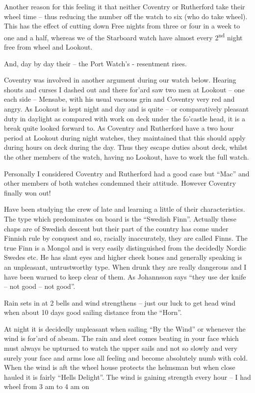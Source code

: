 \documentclass[
  11pt,
  msmallroyalvopaper
]{memoir}
\begin{document}
Another reason for this feeling it that neither Coventry or Rutherford
take their wheel time -- thus reducing the number off the watch to six
(who do take wheel). This has the effect of cutting down Free nights
from three or four in a week to one and a half, whereas we of the
Starboard watch have almost every 2\textsuperscript{nd} night free from
wheel and Lookout.

And, day by day their -- the Port Watch's - resentment rises.

Coventry was involved in another argument during our watch below.
Hearing shouts and curses I dashed out and there for'ard saw two men at
Lookout -- one each side -- Mensabe, with his usual vacuous grin and
Coventry very red and angry. As Lookout is kept night and day and is
quite -- or comparatively pleasant duty in daylight as compared with
work on deck under the fo'castle head, it is a break quite looked
forward to. As Coventry and Rutherford have a two hour period at Lookout
during night watches, they maintained that this should apply during
hours on deck during the day. Thus they escape duties about deck, whilst
the other members of the watch, having no Lookout, have to work the full
watch.

Personally I considered Coventry and Rutherford had a good case but
``Mac'' and other members of both watches condemned their attitude.
However Coventry finally won out!

Have been studying the crew of late and learning a little of their
characteristics. The type which predominates on board is the ``Swedish
Finn''. Actually these chaps are of Swedish descent but their part of
the country has come under Finnish rule by conquest and so, racially
inaccurately, they are called Finns. The true Finn is a Mongol and is
very easily distinguished from the decidedly Nordic Swedes etc. He has
slant eyes and higher cheek bones and generally speaking is an
unpleasant, untrustworthy type. When drunk they are really dangerous and
I have been warned to keep clear of them. As Johannsson says ``they use
der knife -- not good -- not good''.

Rain sets in at 2 bells and wind strengthens -- just our luck to get
head wind when about 10 days good sailing distance from the ``Horn''.

At night it is decidedly unpleasant when sailing ``By the Wind'' or
whenever the wind is for'ard of abeam. The rain and sleet comes beating
in your face which must always be upturned to watch the upper sails and
not so slowly and very surely your face and arms lose all feeling and
become absolutely numb with cold. When the wind is aft the wheel house
protects the helmsman but when close hauled it is fairly ``Hells
Delight''. The wind is gaining strength every hour -- I had wheel from 3
am to 4 am on
\end{document}
